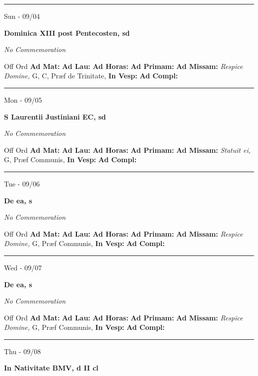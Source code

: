 \documentclass[letterpaper, 10pt]{article}
\begin{document}
\hrule
\begin{center}
Sun - 09/04
\end{center}\textbf{ \large Dominica XIII post Pentecosten, \textnormal{\normalsize sd}}

\textit{No Commemoration}\begin{justify}
Off Ord
\textbf{Ad Mat: }
\textbf{Ad Lau: }
\textbf{Ad Horas: }
\textbf{Ad Primam: }
\textbf{Ad Missam:} \textit{Respice Domine, } G, C, Præf de Trinitate, 
\textbf{In Vesp: }
\textbf{Ad Compl: }\end{justify}



\hrule
\begin{center}
Mon - 09/05
\end{center}\textbf{ \large S Laurentii Justiniani EC, \textnormal{\normalsize sd}}

\textit{No Commemoration}\begin{justify}
Off Ord
\textbf{Ad Mat: }
\textbf{Ad Lau: }
\textbf{Ad Horas: }
\textbf{Ad Primam: }
\textbf{Ad Missam:} \textit{Statuit ei, } G, Præf Communis, 
\textbf{In Vesp: }
\textbf{Ad Compl: }\end{justify}



\hrule
\begin{center}
Tue - 09/06
\end{center}\textbf{ \large De ea, \textnormal{\normalsize s}}

\textit{No Commemoration}\begin{justify}
Off Ord
\textbf{Ad Mat: }
\textbf{Ad Lau: }
\textbf{Ad Horas: }
\textbf{Ad Primam: }
\textbf{Ad Missam:} \textit{Respice Domine, } G, Præf Communis, 
\textbf{In Vesp: }
\textbf{Ad Compl: }\end{justify}



\hrule
\begin{center}
Wed - 09/07
\end{center}\textbf{ \large De ea, \textnormal{\normalsize s}}

\textit{No Commemoration}\begin{justify}
Off Ord
\textbf{Ad Mat: }
\textbf{Ad Lau: }
\textbf{Ad Horas: }
\textbf{Ad Primam: }
\textbf{Ad Missam:} \textit{Respice Domine, } G, Præf Communis, 
\textbf{In Vesp: }
\textbf{Ad Compl: }\end{justify}



\hrule
\begin{center}
Thu - 09/08
\end{center}\textbf{ \large In Nativitate BMV, \textnormal{\normalsize d II cl}}
\end{document}
